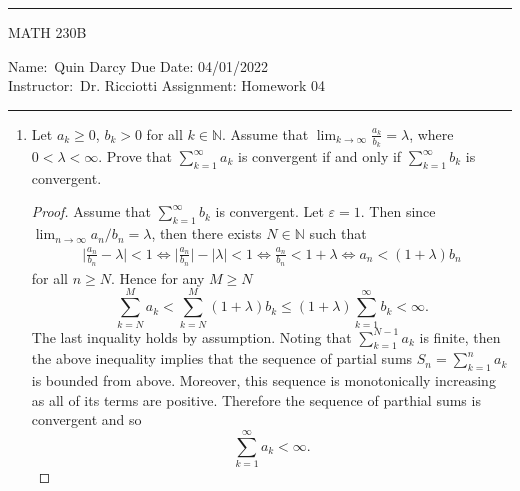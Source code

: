 \documentclass[12pt]{article}
\begin{document}
    \thispagestyle{empty}\hrule

    \begin{center}
        \vspace{.4cm} { \large MATH 230B}
    \end{center}
    {Name:\ Quin Darcy \hspace{\fill} Due Date: 04/01/2022   \\
    { Instructor:}\ Dr. Ricciotti \hspace{\fill} Assignment:
    Homework 04 \\ \hrule}

    \begin{enumerate}
        \item Let $a_k\geq 0$, $b_k>0$ for all $k\in\mathbb{N}$. Assume that
            $\lim_{k\to\infty}\frac{a_k}{b_k}=\lambda$, where
            $0<\lambda<\infty$. Prove that $\sum_{k=1}^{\infty}a_k$ is
            convergent if and only if $\sum_{k=1}^{\infty}b_k$ is convergent. 
            \begin{proof}
                Assume that $\sum_{k=1}^{\infty}b_k$ is convergent. Let
                $\varepsilon=1$. Then since $\lim_{n\to\infty}a_n/b_n=\lambda$,
                then there exists $N\in\mathbb{N}$ such that 
                \begin{align*}
                    \bigg|\frac{a_n}{b_n}-\lambda\bigg|<1 
                    \Leftrightarrow \bigg|\frac{a_n}{b_n}\bigg|-|\lambda|<1 
                    \Leftrightarrow \frac{a_n}{b_n}<1+\lambda 
                    \Leftrightarrow a_n<(1+\lambda)b_n
                \end{align*}
                for all $n\geq N$. Hence for any $M\geq N$
                \begin{equation*}
                    \sum_{k=N}^{M}a_k<\sum_{k=N}^{M}(1+\lambda)b_k
                    \leq(1+\lambda)\sum_{k=1}^{\infty}b_k<\infty.
                \end{equation*}
                The last inquality holds by assumption. Noting that
                $\sum_{k=1}^{N-1}a_k$ is finite, then the above inequality
                implies that the sequence of partial sums
                $S_n=\sum_{k=1}^{n}a_k$ is bounded from above. Moreover, this
                sequence is monotonically increasing as all of its terms are
                positive. Therefore the sequence of parthial sums is convergent
                and so 
                \begin{equation*}
                    \sum_{k=1}^{\infty}a_k<\infty. 

\end{equation*}
\end{proof}
\end{enumerate}
\end{document}
